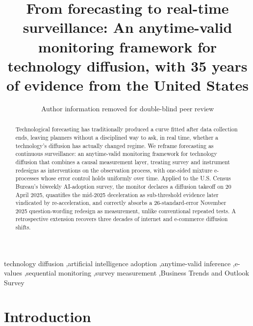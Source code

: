 \documentclass[review,authoryear,12pt]{elsarticle}
\begin{document}
\linenumbers

\begin{frontmatter}

\title{From forecasting to real-time surveillance: An anytime-valid monitoring framework for technology diffusion, with 35 years of evidence from the United States}

\author{Author information removed for double-blind peer review}

\begin{abstract}
Technological forecasting has traditionally produced a curve fitted after data collection ends, leaving planners without a disciplined way to ask, in real time, whether a technology's diffusion has actually changed regime. We reframe forecasting as continuous surveillance: an anytime-valid monitoring framework for technology diffusion that combines a causal measurement layer, treating survey and instrument redesigns as interventions on the observation process, with one-sided mixture e-processes whose error control holds uniformly over time. Applied to the U.S. Census Bureau's biweekly AI-adoption survey, the monitor declares a diffusion takeoff on 20 April 2025, quantifies the mid-2025 deceleration as sub-threshold evidence later vindicated by re-acceleration, and correctly absorbs a 26-standard-error November 2025 question-wording redesign as measurement, unlike conventional repeated tests. A retrospective extension recovers three decades of internet and e-commerce diffusion shifts.
\end{abstract}

\begin{keyword}
technology diffusion \sep artificial intelligence adoption \sep anytime-valid inference \sep e-values \sep sequential monitoring \sep survey measurement \sep Business Trends and Outlook Survey
\end{keyword}

\end{frontmatter}

\section{Introduction}
\label{sec:intro}
\end{document}
